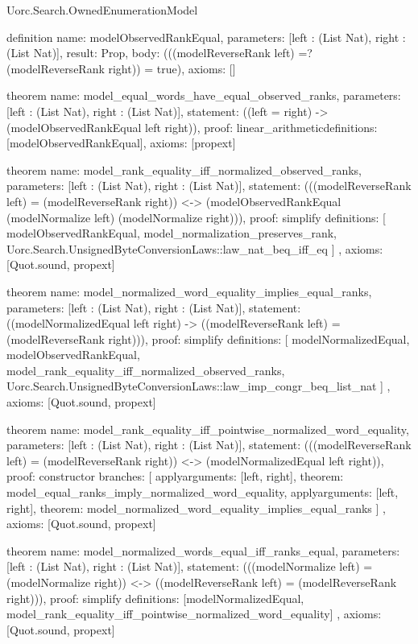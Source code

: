 \begin{lexlean}{Uorc.Search.OwnedEnumerationModel}
\begin{semanticmodule}
definition{
  name: modelObservedRankEqual,
  parameters: [left : (List Nat), right : (List Nat)],
  result: Prop,
  body: (((modelReverseRank left) =? (modelReverseRank right)) = true),
  axioms: []
}

theorem{
  name: model_equal_words_have_equal_observed_ranks,
  parameters: [left : (List Nat), right : (List Nat)],
  statement: ((left = right) -> (modelObservedRankEqual left right)),
  proof: linear_arithmetic{definitions: [modelObservedRankEqual]},
  axioms: [propext]
}

theorem{
  name: model_rank_equality_iff_normalized_observed_ranks,
  parameters: [left : (List Nat), right : (List Nat)],
  statement: (((modelReverseRank left) = (modelReverseRank right)) <-> (modelObservedRankEqual (modelNormalize left) (modelNormalize right))),
  proof: simplify{
    definitions: [
      modelObservedRankEqual,
      model_normalization_preserves_rank,
      Uorc.Search.UnsignedByteConversionLaws::law_nat_beq_iff_eq
    ]
  },
  axioms: [Quot.sound, propext]
}

theorem{
  name: model_normalized_word_equality_implies_equal_ranks,
  parameters: [left : (List Nat), right : (List Nat)],
  statement: ((modelNormalizedEqual left right) -> ((modelReverseRank left) = (modelReverseRank right))),
  proof: simplify{
    definitions: [
      modelNormalizedEqual,
      modelObservedRankEqual,
      model_rank_equality_iff_normalized_observed_ranks,
      Uorc.Search.UnsignedByteConversionLaws::law_imp_congr_beq_list_nat
    ]
  },
  axioms: [Quot.sound, propext]
}

theorem{
  name: model_rank_equality_iff_pointwise_normalized_word_equality,
  parameters: [left : (List Nat), right : (List Nat)],
  statement: (((modelReverseRank left) = (modelReverseRank right)) <-> (modelNormalizedEqual left right)),
  proof: constructor{
    branches: [
      apply{arguments: [left, right], theorem: model_equal_ranks_imply_normalized_word_equality},
      apply{arguments: [left, right], theorem: model_normalized_word_equality_implies_equal_ranks}
    ]
  },
  axioms: [Quot.sound, propext]
}

theorem{
  name: model_normalized_words_equal_iff_ranks_equal,
  parameters: [left : (List Nat), right : (List Nat)],
  statement: (((modelNormalize left) = (modelNormalize right)) <-> ((modelReverseRank left) = (modelReverseRank right))),
  proof: simplify{
    definitions: [modelNormalizedEqual, model_rank_equality_iff_pointwise_normalized_word_equality]
  },
  axioms: [Quot.sound, propext]
}


\end{semanticmodule}
\end{lexlean}
